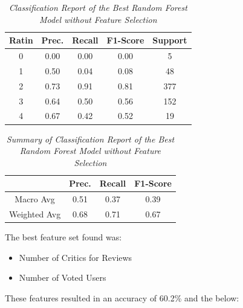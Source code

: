 \documentclass[11pt]{article}
\begin{document}
\begin{table}[!ht]
    \begin{center}
        \begin{tabular}{c|c|c|c|c}			
            \hline
            Ratin & Prec. & Recall & F1-Score & Support \\
            \hline\hline
            0 & 0.00 & 0.00 & 0.00 & 5 \\
            1 & 0.50 & 0.04 & 0.08 & 48 \\
            2 & 0.73 & 0.91 & 0.81 & 377 \\
            3 & 0.64 & 0.50 & 0.56 & 152 \\
            4 & 0.67 & 0.42 & 0.52 & 19\\
                \hline
        \end{tabular}

        \caption{\textit{Classification Report of the Best Random Forest Model without Feature Selection}}
        \label{rf-report}

    \end{center}
\end{table}
\begin{table}[!ht]
    \begin{center}
        \begin{tabular}{c||c|c|c}			
            \hline
             & Prec. & Recall & F1-Score \\
            \hline\hline
            Macro Avg & 0.51 & 0.37 & 0.39 \\
            Weighted Avg & 0.68 & 0.71 & 0.67 \\
                \hline
        \end{tabular}

        \caption{\textit{Summary of Classification Report of the Best Random Forest Model without Feature Selection}}
        \label{rf-report-sum}

    \end{center}
\end{table}
\noindent
The best feature set found was:
\begin{itemize}
    \item Number of Critics for Reviews
    \item Number of Voted Users
\end{itemize}
\noindent
These features resulted in an accuracy of 60.2\% and the below:
\end{document}
